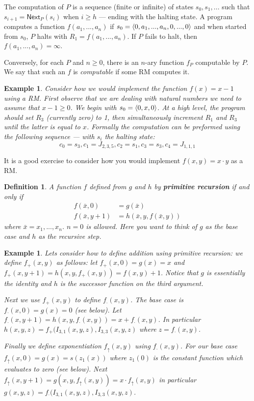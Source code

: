 \documentclass[twoside]{article}
\newtheorem{definition}[theorem]{Definition}
\newtheorem{example}[theorem]{Example}
\def\Next{\mathsf{Next}}
\DeclarePairedDelimiter\anglebrac{\langle}{\rangle}
\begin{document}
The computation of $P$ is a sequence (finite or infinite) of states $s_0, s_1, ...$ such that $s_{i+1} = \Next_P(s_i)$ when $i \geq h$ --- ending with the halting state. A program computes a function $f(a_1, ..., a_n)$ if $s_0 = \anglebrac{0, a_1, ..., a_n, 0,...,0}$ and when started from $s_0$, $P$ halts with $R_1 = f(a_1, ..., a_n)$. If $P$ fails to halt, then $f(a_1, ..., a_n) = \infty$.

Conversely, for each $P$ and $n \geq 0$, there is an $n$-ary function $f_P$ computable by $P$. We say that such an $f$ is \emph{computable} if some RM computes it.

\begin{example}
Consider how we would implement the function $f(x) = x-1$ using a RM. First observe that we are dealing with natural numbers we need to assume that $x-1 \geq 0$. We begin with $s_0 = \anglebrac{0, x, 0}$. At a high level, the program should set $R_3$ (currently zero) to 1, then simultaneously increment $R_1$ and $R_3$ until the latter is equal to $x$. Formally the computation can be preformed using the following sequence --- with $s_i$ the halting state:
\[c_0 = s_3, c_1 = J_{2,3,5}, c_2 = s_1, c_3 = s_3, c_4 = J_{1,1,1}\]       
\end{example}

It is a good exercise to consider how you would implement $f(x,y) = x\cdot y$ as a RM.


\begin{definition}
A function $f$ defined from $g$ and $h$ by \textbf{primitive recursion} if and only if
\begin{align*}
f(\bar{x}, 0) &= g(\bar{x}) \\
f(\bar{x}, y+1) &= h(\bar{x}, y, f(\bar{x}, y))
\end{align*}
where $\bar{x} = x_1, ..., x_n$. $n = 0$ is allowed. Here you want to think of $g$ as the base case and $h$ as the recursive step.
\end{definition}

\begin{example}
Lets consider how to define addition using primitive recursion: we define  $f_{+}(x,y)$ as follows: let $f_{+}(x,0) = g(x) = x$ and $f_{+}(x, y+1) = h(x, y, f_{+}(x,y)) = f(x,y) + 1$. Notice that $g$ is essentially the identity and $h$ is the successor function on the third argument.

Next we use $f_{+}(x,y)$ to define $f_{\cdot}(x,y)$. The base case is $f_{\cdot}(x,0) = g(x) = 0$ (see below). Let $f_{\cdot}(x,y+1) = h(x,y,f_{\cdot}(x,y)) = x + f_{\cdot}(x,y)$. In particular $h(x,y,z) = f_{+}(I_{3,1}(x,y,z), I_{3,3}(x,y,z)$ where $z = f_{\cdot}(x,y)$. 

Finally we define exponentiation $f_{\uparrow}(x,y)$ using $f_{\cdot}(x,y)$. For our base case $f_{\uparrow}(x, 0) = g(x) = s(z_1(x))$ where $z_1(0)$ is the constant function which evaluates to zero (see below). Next $f_{\uparrow}(x,y+1) = g(x,y,f_{\uparrow}(x,y)) = x \cdot f_{\uparrow}(x,y)$ in particular $g(x,y,z) = f_{\cdot}(I_{3,1}(x,y,z), I_{3,3}(x,y,z)$.  
\end{example}
\end{document}
